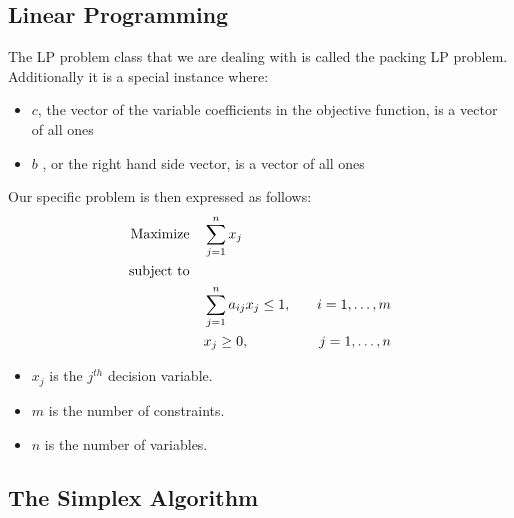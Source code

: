 \subsection{Linear Programming}
The LP problem class that we are dealing with is called the packing LP problem. Additionally
it is a special instance where:
\begin{itemize}
    \item \( c \), the vector of the variable coefficients in the objective function,
    is a vector of all ones
    \item \( b \) , or the right hand side vector,  is a vector of all ones
\end{itemize}
Our specific problem is then expressed as follows:
\begin{align}
    \text{Maximize} \quad & \sum_{j=1}^{n} x_j \notag \\
    \text{subject to} \quad & \notag \\
    & \sum_{j=1}^{n} a_{ij} x_j \leq 1, \quad & i = 1, \ldots, m \notag \\
    & x_j \geq 0, \quad & j = 1, \ldots, n \label{LP_Problem}
\end{align}
\begin{itemize}
    \item \( x_j \) is the \( j^{th} \) decision variable.
    \item \( m \) is the number of constraints.
    \item \( n \) is the number of variables.
\end{itemize}

\subsection{The Simplex Algorithm}
